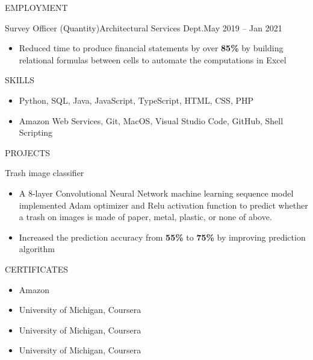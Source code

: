 \documentclass[]{resume}
\begin{document}
\begin{cvsection}{EMPLOYMENT}
		\begin{cvsubsection}{Survey Officer (Quantity)}{Architectural Services Dept.}{May 2019 -- Jan 2021}	
			\begin{itemize}
				\item Reduced time to produce financial statements by over \textbf{85\%} by building relational formulas between cells to automate the computations in Excel
			\end{itemize}
		\end{cvsubsection}
	\end{cvsection}

	\begin{cvsection}{SKILLS}
		\begin{cvsubsection}{}{}{}	
			\begin{itemize}
				\item Python, SQL, Java, JavaScript, TypeScript, HTML, CSS, PHP
				\item Amazon Web Services, Git, MacOS, Visual Studio Code, GitHub, Shell Scripting
			\end{itemize}
		\end{cvsubsection}
	\end{cvsection}
	
	\begin{cvsection}{PROJECTS}
		\begin{cvsubsection}{Trash image classifier}{}{}
			\begin{itemize}
			    \item A 8-layer Convolutional Neural Network machine learning sequence model implemented Adam optimizer and Relu activation function to predict whether a trash on images is made of paper, metal, plastic, or none of above. 
			    \item Increased the prediction accuracy from \textbf{55\%} to \textbf{75\%} by improving prediction algorithm
			\end{itemize}
		\end{cvsubsection}
	\end{cvsection}
	
	\begin{cvsection}{CERTIFICATES}
		\begin{cvsubsection}{}{}{}
		    \begin{itemize}
            \item \noindent {} \hfill {Amazon} \hfill {}
            \newline \noindent {} \hfill {} \hfill \llap{}
		        \item \noindent {} \hfill {University of Michigan, Coursera}\hfill {}
		        \item \noindent {} \hfill {University of Michigan, Coursera}\hfill {}
		        \item \noindent {} \hfill {University of Michigan, Coursera}\hfill {}
		    \end{itemize}
		\end{cvsubsection}
	\end{cvsection}
\end{document}
